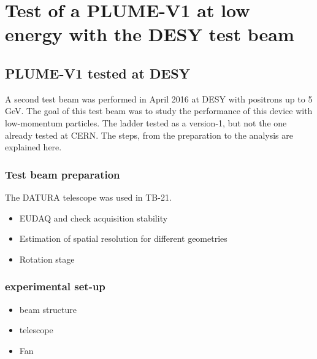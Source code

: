 \chapter{Test of a PLUME-V1 at low energy with the DESY test beam}

\minitoc

  \section{PLUME-V1 tested at DESY}

   A second test beam was performed in April 2016 at DESY with positrons up to 5 GeV. 
   The goal of this test beam was to study the performance of this device with low-momentum particles.
   The ladder tested as a version-1, but not the one already tested at CERN.
   The steps, from the preparation to the analysis are explained here.

    \subsection{Test beam preparation}

    The DATURA telescope was used in TB-21. 
    \begin{itemize}
      \item EUDAQ and check acquisition stability
      \item Estimation of spatial resolution for different geometries
      \item Rotation stage
    \end{itemize}

    \begin{figure}
    \end{figure}

    \begin{figure}
    \end{figure}

    \subsection{experimental set-up}

    \begin{itemize}
      \item beam structure
      \item telescope
      \item Fan
    \end{itemize}
    \begin{figure}
    \end{figure}

